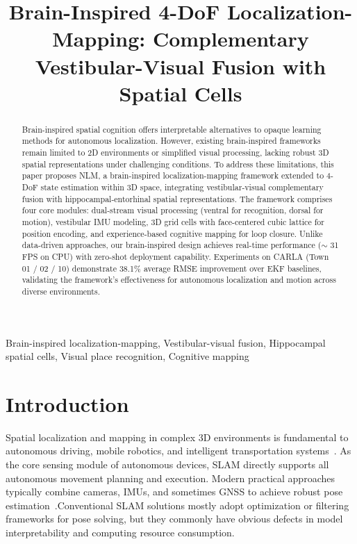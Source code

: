 \documentclass[twocolumn,journal]{IEEEtran}
\title{Brain-Inspired 4-DoF Localization-Mapping: Complementary Vestibular-Visual Fusion with Spatial Cells}
\author{
\IEEEauthorblockN{name}
\IEEEauthorblockA{hutb\\
changsha, 400210\\
Email: xxx@shturl.}
}
\begin{document}
\maketitle

\begin{abstract}
    \sloppy
    Brain-inspired spatial cognition offers interpretable alternatives to opaque learning methods for autonomous localization. However, existing brain-inspired frameworks remain limited to 2D environments or simplified visual processing, lacking robust 3D spatial representations under challenging conditions. To address these limitations, this paper proposes NLM, a brain-inspired localization-mapping framework extended to 4-DoF state estimation within 3D space, integrating vestibular-visual complementary fusion with hippocampal-entorhinal spatial representations. The framework comprises four core modules: dual-stream visual processing (ventral for recognition, dorsal for motion), vestibular IMU modeling, 3D grid cells with face-centered cubic lattice for position encoding, and experience-based cognitive mapping for loop closure. Unlike data-driven approaches, our brain-inspired design achieves real-time performance ($\sim$ 31 FPS on CPU) with zero-shot deployment capability. Experiments on CARLA (Town 01 / 02 / 10) demonstrate 38.1\% average RMSE improvement over EKF baselines, validating the framework's effectiveness for autonomous localization and motion across diverse environments.
\end{abstract}

\IEEEkeywords
Brain-inspired localization-mapping, Vestibular-visual fusion, Hippocampal spatial cells, Visual place recognition, Cognitive mapping

\section{Introduction}
\label{sec:intro}

Spatial localization and mapping in complex 3D environments is fundamental to autonomous driving, mobile robotics, and intelligent transportation systems~\cite{cadena2016past}. As the core sensing module of autonomous devices, SLAM directly supports all autonomous movement planning and execution. Modern practical approaches typically combine cameras, IMUs, and sometimes GNSS to achieve robust pose estimation~\cite{saputra2018visual}.Conventional SLAM solutions mostly adopt optimization or filtering frameworks for pose solving, but they commonly have obvious defects in model interpretability and computing resource consumption.
\end{document}
